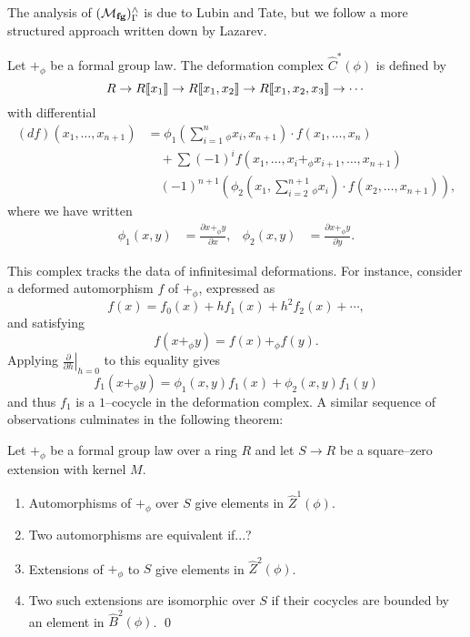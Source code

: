 The analysis of $(\mathcal{M}_{\mathbf{fg}})^\wedge_\Gamma$ is due to Lubin and Tate, but we follow a more structured approach written down by Lazarev.
\begin{definition}
Let $+_\phi$ be a formal group law. The deformation complex $\widehat C^*(\phi)$ is defined by \[R \to R\llbracket{x_1}\rrbracket \to R\llbracket{x_1, x_2}\rrbracket \to R\llbracket{x_1, x_2, x_3}\rrbracket \to \cdots\] with differential
\begin{align*}
(df)(x_1, \ldots, x_{n+1}) & = \phi_1\left(\sum_{i=1}^n {}_\phi x_i, x_{n+1} \right) \cdot f(x_1, \ldots, x_n) \\
& \quad + \sum (-1)^i f(x_1, \ldots, x_i +_\phi x_{i+1}, \ldots, x_{n+1}) \\
& \quad (-1)^{n+1} \left( \phi_2\left(x_1, \sum_{i=2}^{n+1} {}_\phi x_i \right) \cdot f(x_2, \ldots, x_{n+1}) \right),
\end{align*}
where we have written
\begin{align*}
\phi_1(x, y) & = \frac{\partial x +_\phi y}{\partial x}, &
\phi_2(x, y) & = \frac{\partial x +_\phi y}{\partial y}.
\end{align*}
\end{definition}

This complex tracks the data of infinitesimal deformations.  For instance, consider a deformed automorphism $f$ of $+_\phi$, expressed as \[f(x) = f_0(x) + h f_1(x) + h^2 f_2(x) + \cdots,\] and satisfying \[f(x +_\phi y) = f(x) +_\phi f(y).\]  Applying $\left.\frac{\partial}{\partial h}\right|_{h=0}$ to this equality gives \[f_1(x +_\phi y) = \phi_1(x, y)f_1(x) + \phi_2(x, y)f_1(y)\] and thus $f_1$ is a $1$--cocycle in the deformation complex.  A similar sequence of observations culminates in the following theorem:
\begin{theorem}
Let $+_\phi$ be a formal group law over a ring $R$ and let $S \to R$ be a square--zero extension with kernel $M$.
\begin{enumerate}
\item Automorphisms of $+_\phi$ over $S$ give elements in $\widehat Z^1(\phi)$.
\item Two automorphisms are equivalent if...?
\item Extensions of $+_\phi$ to $S$ give elements in $\widehat Z^2(\phi)$.
\item Two such extensions are isomorphic over $S$ if their cocycles are bounded by an element in $\widehat B^2(\phi)$. \qed
\end{enumerate}
\end{theorem}

